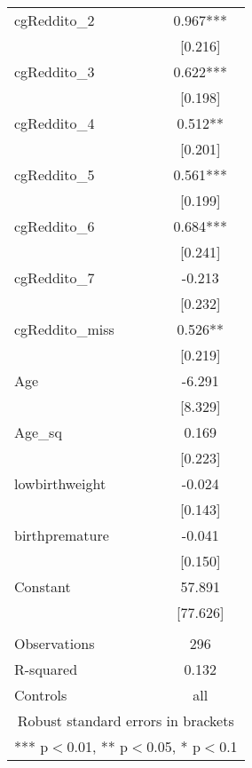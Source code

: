 \documentclass[]{article}
\begin{document}
\begin{tabular}{lc}
cgReddito\_2 & 0.967*** \\
 & [0.216] \\
cgReddito\_3 & 0.622*** \\
 & [0.198] \\
cgReddito\_4 & 0.512** \\
 & [0.201] \\
cgReddito\_5 & 0.561*** \\
 & [0.199] \\
cgReddito\_6 & 0.684*** \\
 & [0.241] \\
cgReddito\_7 & -0.213 \\
 & [0.232] \\
cgReddito\_miss & 0.526** \\
 & [0.219] \\
Age & -6.291 \\
 & [8.329] \\
Age\_sq & 0.169 \\
 & [0.223] \\
lowbirthweight & -0.024 \\
 & [0.143] \\
birthpremature & -0.041 \\
 & [0.150] \\
Constant & 57.891 \\
 & [77.626] \\
 &  \\
Observations & 296 \\
R-squared & 0.132 \\
 Controls & all \\ \hline
\multicolumn{2}{c}{ Robust standard errors in brackets} \\
\multicolumn{2}{c}{ *** p$<$0.01, ** p$<$0.05, * p$<$0.1} \\
\end{tabular}
\end{document}
